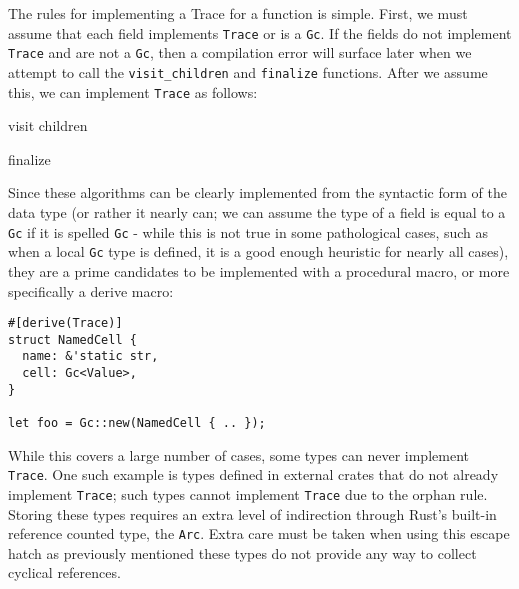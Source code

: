 \documentclass[sigplan,authordraft]{acmart}
\begin{document}
The rules for implementing a Trace for a function is simple. First, we must
assume that each field implements \texttt{Trace} or is a \texttt{Gc}. If the
fields do not implement \texttt{Trace} and are not a \texttt{Gc}, then a
compilation error will surface later when we attempt to call the
\texttt{visit\_children} and \texttt{finalize} functions. After we assume this,
we can implement \texttt{Trace} as follows:

\begin{algorithm}
  \caption{visit children}\label{alg:cap}

\end{algorithm}

\begin{algorithm}
  \caption{finalize}\label{alg:cap}

\end{algorithm}

Since these algorithms can be clearly implemented from the syntactic form of the
data type (or rather it nearly can; we can assume the type of a field is equal to
a \texttt{Gc} if it is spelled \texttt{Gc} - while this is not true in some
pathological cases, such as when a local \texttt{Gc} type is defined, it is a
good enough heuristic for nearly all cases), they are a prime candidates to be
implemented with a procedural macro, or more specifically a derive
macro\cite{derive}:

\begin{verbatim}
#[derive(Trace)]
struct NamedCell {
  name: &'static str,
  cell: Gc<Value>,
}

let foo = Gc::new(NamedCell { .. });
\end{verbatim}

While this covers a large number of cases, some types can never implement
\texttt{Trace}. One such example is types defined in external crates that do not
already implement \texttt{Trace}; such types cannot implement \texttt{Trace} due
to the orphan rule\cite{orphan}. Storing these types requires an extra level of
indirection through Rust's built-in reference counted type, the
\texttt{Arc}\cite{arc}. Extra care must be taken when using this escape hatch as
previously mentioned these types do not provide any way to collect cyclical
references.
\end{document}

